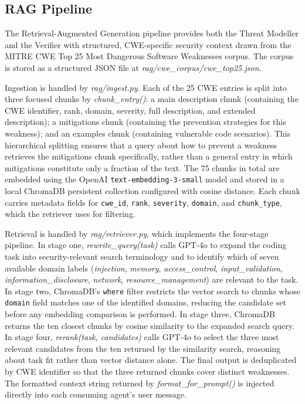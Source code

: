 \subsection{RAG Pipeline}

The Retrieval-Augmented Generation pipeline provides both the Threat Modeller and the Verifier with structured, CWE-specific security context drawn from the MITRE CWE Top 25 Most Dangerous Software Weaknesses corpus. The corpus is stored as a structured JSON file at \textit{rag/cwe\_corpus/cwe\_top25.json}.

Ingestion is handled by \textit{rag/ingest.py}. Each of the 25 CWE entries is split into three focused chunks by \textit{chunk\_entry()}: a main description chunk (containing the CWE identifier, rank, domain, severity, full description, and extended description); a mitigations chunk (containing the prevention strategies for this weakness); and an examples chunk (containing vulnerable code scenarios). This hierarchical splitting ensures that a query about how to prevent a weakness retrieves the mitigations chunk specifically, rather than a general entry in which mitigations constitute only a fraction of the text. The 75 chunks in total are embedded using the OpenAI \texttt{text-embedding-3-small} model and stored in a local ChromaDB persistent collection configured with cosine distance. Each chunk carries metadata fields for \texttt{cwe\_id}, \texttt{rank}, \texttt{severity}, \texttt{domain}, and \texttt{chunk\_type}, which the retriever uses for filtering.

Retrieval is handled by \textit{rag/retriever.py}, which implements the four-stage pipeline. In stage one, \textit{rewrite\_query(task)} calls GPT-4o to expand the coding task into security-relevant search terminology and to identify which of seven available domain labels (\textit{injection}, \textit{memory}, \textit{access\_control}, \textit{input\_validation}, \textit{information\_disclosure}, \textit{network}, \textit{resource\_management}) are relevant to the task. In stage two, ChromaDB's \texttt{where} filter restricts the vector search to chunks whose \texttt{domain} field matches one of the identified domains, reducing the candidate set before any embedding comparison is performed. In stage three, ChromaDB returns the ten closest chunks by cosine similarity to the expanded search query. In stage four, \textit{rerank(task, candidates)} calls GPT-4o to select the three most relevant candidates from the ten returned by the similarity search, reasoning about task fit rather than vector distance alone. The final output is deduplicated by CWE identifier so that the three returned chunks cover distinct weaknesses. The formatted context string returned by \textit{format\_for\_prompt()} is injected directly into each consuming agent's user message.

